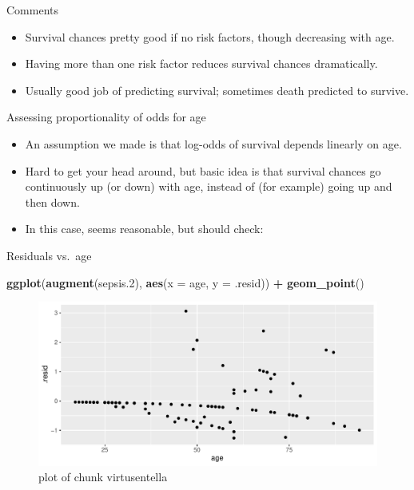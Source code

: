 \documentclass[ignorenonframetext,]{beamer}
\newenvironment{Shaded}{\begin{snugshade}}{\end{snugshade}}
\newcommand{\DataTypeTok}[1]{\textcolor[rgb]{0.13,0.29,0.53}{#1}}
\newcommand{\FloatTok}[1]{\textcolor[rgb]{0.00,0.00,0.81}{#1}}
\newcommand{\KeywordTok}[1]{\textcolor[rgb]{0.13,0.29,0.53}{\textbf{#1}}}
\newcommand{\NormalTok}[1]{#1}
\newcommand{\OperatorTok}[1]{\textcolor[rgb]{0.81,0.36,0.00}{\textbf{#1}}}
\newcommand{\StringTok}[1]{\textcolor[rgb]{0.31,0.60,0.02}{#1}}
\begin{document}
\begin{frame}{Comments}
\protect\hypertarget{comments-13}{}

\begin{itemize}
\item
  Survival chances pretty good if no risk factors, though decreasing
  with age.
\item
  Having more than one risk factor reduces survival chances
  dramatically.
\item
  Usually good job of predicting survival; sometimes death predicted to
  survive.
\end{itemize}

\end{frame}

\begin{frame}{Assessing proportionality of odds for age}
\protect\hypertarget{assessing-proportionality-of-odds-for-age}{}

\begin{itemize}
\item
  An assumption we made is that log-odds of survival depends linearly on
  age.
\item
  Hard to get your head around, but basic idea is that survival chances
  go continuously up (or down) with age, instead of (for example) going
  up and then down.
\item
  In this case, seems reasonable, but should check:
\end{itemize}

\end{frame}

\begin{frame}[fragile]{Residuals vs.~age}
\protect\hypertarget{residuals-vs.age}{}

\begin{Shaded}
\begin{Highlighting}[]
\KeywordTok{ggplot}\NormalTok{(}\KeywordTok{augment}\NormalTok{(sepsis}\FloatTok{.2}\NormalTok{), }\KeywordTok{aes}\NormalTok{(}\DataTypeTok{x =}\NormalTok{ age, }\DataTypeTok{y =}\NormalTok{ .resid)) }\OperatorTok{+}
\StringTok{  }\KeywordTok{geom_point}\NormalTok{()}
\end{Highlighting}
\end{Shaded}

\begin{figure}
\centering
\includegraphics{figure/virtusentella-1.pdf}
\caption{plot of chunk virtusentella}
\end{figure}

\end{frame}
\end{document}
